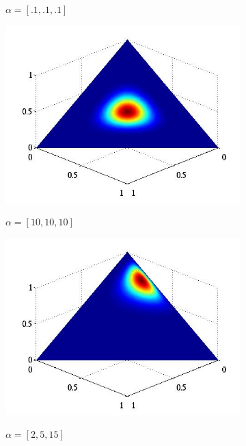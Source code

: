 \documentclass[12pt]{beamer}
\begin{document}
\begin{frame}
\begin{figure}[!h]
\begin{subfigure}[t]{0.35\textwidth}
            $\alpha = [.1, .1, .1]$
        \end{subfigure}

        \medskip

        \begin{subfigure}[t]{0.35\textwidth}
            \centering
            \includegraphics[width=\textwidth]{images/dirichlet_distribution_uniform_ten.png}

            $\alpha = [10, 10, 10]$
        \end{subfigure}
        \begin{subfigure}[t]{0.35\textwidth}
            \centering
            \includegraphics[width=\textwidth]{images/dirichlet_distribution_skewed.png}

            $\alpha = [2, 5, 15]$
        \end{subfigure}
    \end{figure}


\end{frame}
\end{document}
